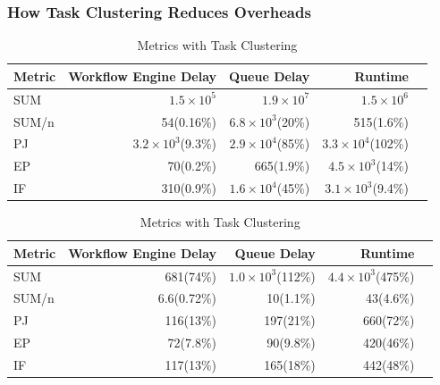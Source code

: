 \subsubsection{How Task Clustering Reduces Overheads}

\begin{table}[htb]
	\footnotesize
	\centering
	\begin{tabular}{l|rrrr}
Metric & Workflow Engine Delay  &Queue Delay& Runtime\\
		\hline
		SUM & $1.5\times 10^5$ & $1.9\times 10^7$ &  $1.5\times 10^6$ \\
		SUM/n & 54(0.16\%) & $6.8\times 10^3$(20\%)& 515(1.6\%) \\
		PJ & $3.2\times 10^3$(9.3\%) & $2.9\times 10^4$(85\%) & $3.3\times 10^4$(102\%) \\
		EP & 70(0.2\%) & 665(1.9\%) & $4.5\times 10^3$(14\%) \\
		IF & 310(0.9\%)& $1.6\times 10^4$(45\%) & $3.1\times 10^3$(9.4\%)\\
	\end{tabular}
		\caption{Metrics Without Task Clustering}
		\label{tab:profiling_no_clustering}
	\quad
	\begin{tabular}{l|rrrr}
Metric & Workflow Engine Delay  &Queue Delay& Runtime\\
		\hline
		SUM & 681(74\%) & $1.0\times 10^3$(112\%) &  $4.4\times 10^3$(475\%) \\
		SUM/n & 6.6(0.72\%) & 10(1.1\%)& 43(4.6\%) \\
		PJ & 116(13\%) & 197(21\%) & 660(72\%) \\
		EP & 72(7.8\%) & 90(9.8\%) & 420(46\%) \\
		IF & 117(13\%)& 165(18\%) & 442(48\%)\\
	\end{tabular}
		\caption{Metrics with Task Clustering}
	\label{tab:profiling_clustering}
\end{table}

